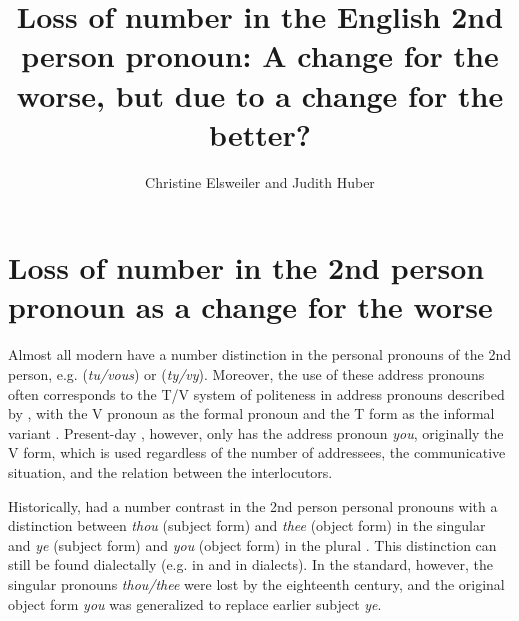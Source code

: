 \documentclass[output=paper,hidelinks]{langscibook}
\author{Christine Elsweiler\affiliation{LMU Munich} and Judith Huber\affiliation{Friedrich-Alexander-Universität Erlangen-Nürnberg}}
\title[Loss of number in the English 2nd person pronoun]{Loss of number in the English 2nd person pronoun: A change for the worse, but due to a change for the better?}
\begin{document}
\maketitle

\section{Loss of number in the 2nd person pronoun as a change for the worse}\label{sec:eh:1}

Almost all modern  have a number distinction in the personal pronouns of the 2nd person, e.g.  (\textit{tu/vous}) or  (\textit{ty/vy}). Moreover, the use of these address pronouns often corresponds to the T/V system of politeness in address pronouns described by \citet{Brown1960}, with the V pronoun as the formal pronoun and the T form as the informal variant \citep[74]{Jucker2013}. Present-day , however, only has the address pronoun \textit{you}, originally the V form, which is used regardless of the number of addressees, the communicative situation, and the relation between the interlocutors.

Historically,  had a number contrast in the 2nd person personal pronouns with a distinction between \textit{thou} (subject form) and \textit{thee} (object form) in the singular and \textit{ye} (subject form) and \textit{you} (object form) in the plural \citep[148]{Lass1999}. This distinction can still be found dialectally (e.g. in  and in  dialects). In the standard, however, the singular pronouns \textit{thou/thee} were lost by the eighteenth century, and the original object form \textit{you} was generalized to replace earlier subject \textit{ye}.
\end{document}
